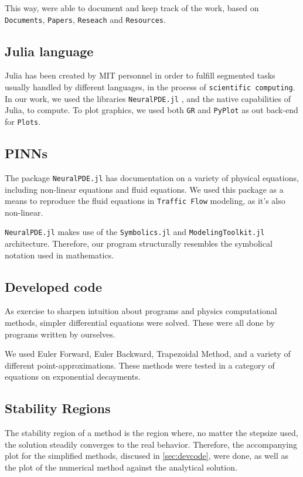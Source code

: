 \documentclass[11pt]{article}
\begin{document}
This way, were able to document and keep track of the work, based on \texttt{Documents}, \texttt{Papers}, \texttt{Reseach} and \texttt{Resources}.

\subsection{Julia language}
\label{sec:orgc25f8ab}

Julia has been created by MIT personnel in order to fulfill segmented tasks
usually handled by different languages, in the process of \texttt{scientific
computing}. In our work, we used the libraries \texttt{NeuralPDE.jl}
\cite{zubov2021neuralpde}, and the native capabilities of Julia, to compute. To
plot graphics, we used both \texttt{GR} and \texttt{PyPlot} as out back-end for \texttt{Plots}.

\subsection{PINNs}
\label{sec:orgb9fe131}
The package \texttt{NeuralPDE.jl} has documentation on a variety of physical equations,
including non-linear equations and fluid equations. We used this package as a
means to reproduce the fluid equations in \texttt{Traffic Flow} modeling, as it's also
non-linear.

\texttt{NeuralPDE.jl} makes use of the \texttt{Symbolics.jl} and \texttt{ModelingToolkit.jl}
architecture. Therefore, our program structurally resembles the symbolical
notation used in mathematics.

\subsection{Developed code}
\label{sec:orge8a8007}
\label{sec:devcode}
As exercise to sharpen intuition about programs and physics computational
methods, simpler differential equations were solved. These were all done by
programs written by ourselves.

We used Euler Forward, Euler Backward, Trapezoidal Method, and a variety of
different point-approximations. These methods were tested in a category of
equations on exponential decayments.

\subsection{Stability Regions}
\label{sec:org50bcb78}
The stability region of a method is the region where, no matter the stepsize
used, the solution steadily converges to the real behavior. Therefore, the
accompanying plot for the simplified methods, discused in \ref{sec:devcode}, were
done, as well as the plot of the numerical method against the analytical solution.
\end{document}
